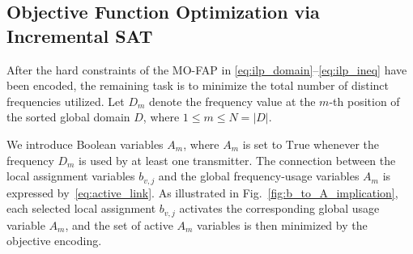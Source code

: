 \documentclass[letterpaper,journal]{IEEEtran}
\begin{document}


\subsection{Objective Function Optimization via Incremental SAT}
\label{subsec:incremental_sat}
After the hard constraints of the MO-FAP in \eqref{eq:ilp_domain}--\eqref{eq:ilp_ineq} have been encoded, the remaining task is to minimize the total number of distinct frequencies utilized. Let $D_m$ denote the frequency value at the $m$-th position of the sorted global domain $D$, where $1 \le m \le N=|D|$.

We introduce Boolean variables $A_m$, where $A_m$ is set to $\text{True}$ whenever the frequency $D_m$ is used by at least one transmitter.
The connection between the local assignment variables $b_{v,j}$ and the global frequency-usage variables $A_m$ is expressed by~\eqref{eq:active_link}.
As illustrated in Fig.~\ref{fig:b_to_A_implication}, each selected local assignment $b_{v,j}$ activates the corresponding global usage variable $A_m$, and the set of active $A_m$ variables is then minimized by the objective encoding.
\end{document}
